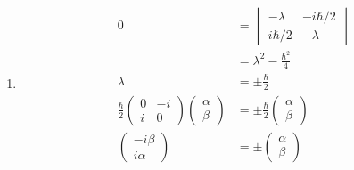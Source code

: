 \documentclass{article}
\begin{document}
\subsection{}

\begin{enumerate}
  \item

        \begin{align*}
          0                               & = \begin{vmatrix}
                                                -\lambda    & -i \hbar / 2 \\
                                                i \hbar / 2 & -\lambda
                                              \end{vmatrix}                     \\
                                          & = \lambda^2 - \frac{\hbar^2}{4}                  \\
          \lambda                         & = \pm \frac{\hbar}{2}                            \\
          \frac{\hbar}{2} \begin{pmatrix}
                            0 & -i \\
                            i & 0
                          \end{pmatrix} \begin{pmatrix}
                                          \alpha \\
                                          \beta
                                        \end{pmatrix} & = \pm \frac{\hbar}{2} \begin{pmatrix}
                                                                                \alpha \\
                                                                                \beta
                                                                              \end{pmatrix} \\
          \begin{pmatrix}
            -i \beta \\
            i \alpha
          \end{pmatrix}                 & = \pm \begin{pmatrix}
                                                  \alpha \\
                                                  \beta

\end{pmatrix}
\end{align*}
\end{enumerate}
\end{document}
